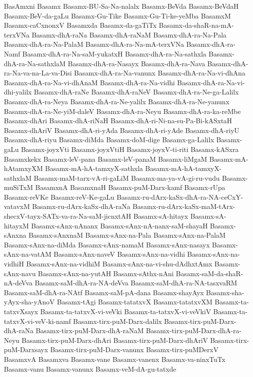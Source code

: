{BasAmxni
Basamx
Basamx-BU-Sa-Na-nalalx
Basamx-BeVda
Basamx-BeVdaH
Basamx-BeV-da-gaLu
Basamx-Gu-Tike
Basamx-Gu-Ti-ke-yeMba
BasamxM
Basamx-caCxnonxV
Basamxda
Basamx-da-gaTiTx
Basamx-da-shaR-na-mA-terxVNa
Basamx-dhA-raNa
Basamx-dhA-raNaM
Basamx-dhA-ra-Na-Pala
Basamx-dhA-ra-Na-PalaM
Basamx-dhA-ra-Na-mA-terxVNa
Basamx-dhA-ra-Namf
Basamx-dhA-ra-Na-saM-yukatxH
Basamx-dhA-ra-Na-sathxla
Basamx-dhA-ra-Na-sathxlaM
Basamx-dhA-ra-Nasayx
Basamx-dhA-ra-Nava
Basamx-dhA-ra-Na-va-na-La-va-Disi
Basamx-dhA-ra-Na-vanunx
Basamx-dhA-ra-Na-vi-dhAna
Basamx-dhA-ra-Na-vi-dhAnaM
Basamx-dhA-ra-Na-vidhi
Basamx-dhA-ra-Na-vi-dhi-yalilx
Basamx-dhA-raNe
Basamx-dhA-raNeV
Basamx-dhA-ra-Ne-ga-Lalilx
Basamx-dhA-ra-Neya
Basamx-dhA-ra-Ne-yalilx
Basamx-dhA-ra-Ne-yanunx
Basamx-dhA-ra-Ne-yiM-daleV
Basamx-dhA-ra-Neyu
Basamx-dhA-ra-ka-reMbe
Basamx-dhAri
Basamx-dhA-riNaH
Basamx-dhA-ri-Ni-na-su-Pa-Bi-kASxtaH
Basamx-dhAriV
Basamx-dhA-ri-yAda
Basamx-dhA-ri-yAde
Basamx-dhA-riyU
Basamx-dhA-riyu
Basamx-diMda
Basamx-doM-dige
Basamx-ga-Lalilx
Basamx-gaLu
Basamx-joyxVti
Basamx-joyxVtiH
Basamx-joyxV-ti-riti
Basamx-kASxra
Basamxkekx
Basamx-leV-pana
Basamx-leV-panaM
Basamx-liMgaM
Basamx-mA-hAtamxyXM
Basamx-mA-hA-tamxyX-sathxla
Basamx-mA-hA-tamxyX-sathxlaM
Basamx-maM-tarx-vA-ri-gaLiM
Basamx-ma-ya-vA-gi-ru-vudu
Basamx-muSiTxM
BasamxnA
BasamxnaH
Basamx-puM-Darx-kamf
Basamx-rUpa
Basamx-reVKe
Basamx-reV-Ke-gaLu
Basamx-ru-dArx-kaSx-dhA-ra-NA-ceCxY-vatavxM
Basamx-ru-dArx-kaSx-dhA-raNa
Basamx-ru-dArx-kaSx-maM-tArx-shecxV-tayx-SATx-va-ra-Na-saM-jicnxtAH
Basamx-sA-hitayx
Basamx-sA-hitayxM
Basamx-sAnx-nAnanx
Basamx-sAnx-nA-nanx-saM-shayaH
Basamx-sAnxna
Basamx-sAnxnaM
Basamx-sAnx-na-Pala
Basamx-sAnx-na-PalaM
Basamx-sAnx-na-diMda
Basamx-sAnx-namaM
Basamx-sAnx-nasayx
Basamx-sAnx-na-vatAM
Basamx-sAnx-naveV
Basamx-sAnx-na-vidhi
Basamx-sAnx-na-vidhiH
Basamx-sAnx-na-vidhiM
Basamx-sAnx-na-vi-shu-dAdhxtAmx
Basamx-sAnx-navu
Basamx-sAnx-na-yutAH
Basamx-sAthx-nAni
Basamx-saM-da-shaR-nA-deVva
Basamx-saM-dhA-ra-NA-deVva
Basamx-saM-dhA-ra-NA-tasxvaRM
Basamx-saM-dhA-ra-NAtf
Basamx-saM-pA-dana
Basamx-shayAyx
Basamx-sha-yAyx-sha-yAnoV
Basamx-tAgi
Basamx-tatatxvX
Basamx-tatatxvXM
Basamx-ta-tatxvXsayx
Basamx-ta-tatxvX-vi-veVki
Basamx-ta-tatxvX-vi-veVkiV
Basamx-ta-tatxvX-vi-veV-ki-namf
Basamx-tirx-puM-Darx-dalilx
Basamx-tirx-puM-Darx-dhA-raNa
Basamx-tirx-puM-Darx-dhA-raNaM
Basamx-tirx-puM-Darx-dhA-ra-Neyu
Basamx-tirx-puM-Darx-dhAri
Basamx-tirx-puM-Darx-dhAriV
Basamx-tirx-puM-Darxsayx
Basamx-tirx-puM-Darx-vanunx
Basamx-tirx-puMDerxV
BasamxvA
Basamxva
Basamx-vane
Basamx-vanenx
Basamx-va-ninxTuTx
Basamx-vanu
Basamx-vanunx
Basamx-veM-dA-gu-tatxde
}
